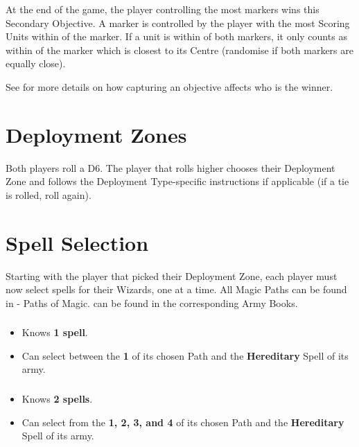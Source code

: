 At the end of the game, the player controlling the most markers wins this Secondary Objective. A marker is controlled by the player with the most Scoring Units within  of the marker. If a unit is within  of both markers, it only counts as within  of the marker which is closest to its Centre (randomise if both markers are equally close).

See  for more details on how capturing an objective affects who is the winner.

\section{Deployment Zones}
\label{deployment_zones}

Both players roll a D6. The player that rolls higher chooses their Deployment Zone and follows the Deployment Type-specific instructions if applicable (if a tie is rolled, roll again).

\section{Spell Selection}
\label{spell_selection}

Starting with the player that picked their Deployment Zone, each player must now select spells for their Wizards, one at a time. All Magic Paths can be found in \nameofthegame{} - Paths of Magic. \hereditaryspells{} can be found in the corresponding Army Books.

\subsubsection{\wizardapprentice}

\begin{itemize}[label={-}]
\item Knows \textbf{1 spell}.
\item Can select between the \learnedspell{} \textbf{1} of its chosen Path and the \textbf{Hereditary} Spell of its army.
\end{itemize}

\subsubsection{\wizardadept}

\begin{itemize}[label={-}]
\item Knows \textbf{2 spells}.
\item Can select from the \learnedspells{} \textbf{1, 2, 3, and 4} of its chosen Path and the \textbf{Hereditary} Spell of its army.
\end{itemize}

